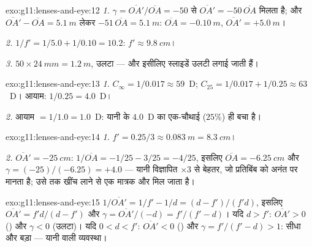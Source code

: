 \begin{solution}{exo:g11:lenses-and-eye:12}
\emph{1.} $\gamma = \overline{OA'}/\overline{OA} = -50$ से $\overline{OA'} = -50\,\overline{OA}$ मिलता है; और $\overline{OA'} - \overline{OA} = \qty{5.1}{m}$ लेकर $-51\,\overline{OA} = \qty{5.1}{m}$: $\overline{OA} = \qty{-0.10}{m}$,
$\overline{OA'} = +\qty{5.0}{m}$।

\emph{2.} $1/f' = 1/5.0 + 1/0.10 = 10.2$: $f' \approx \qty{9.8}{cm}$।

\emph{3.} $50 \times \qty{24}{mm} = \qty{1.2}{m}$, उलटा --- और इसीलिए स्लाइडें उलटी लगाई जाती हैं।
\end{solution}

\begin{solution}{exo:g11:lenses-and-eye:13}
\emph{1.} $C_\infty = 1/0.017 \approx 59$~D; $C_{25} = 1/0.017 + 1/0.25 \approx 63$~D। आयाम: $1/0.25 = 4.0$~D।

\emph{2.} आयाम $= 1/1.0 = 1.0$~D: यानी  के $4.0$~D
का एक-चौथाई ($25\%$) ही बचा है।
\end{solution}

\begin{solution}{exo:g11:lenses-and-eye:14}
\emph{1.} $f' = 0.25/3 \approx \qty{0.083}{m} = \qty{8.3}{cm}$।

\emph{2.} $\overline{OA'} = \qty{-25}{cm}$: $1/\overline{OA} = -1/25 - 3/25 = -4/25$, इसलिए $\overline{OA} = \qty{-6.25}{cm}$ और $\gamma = (-25)/(-6.25) = +4.0$ --- यानी विज्ञापित
$\times 3$ से बेहतर, जो प्रतिबिंब को अनंत पर मानता है; उसे
 तक खींच लाने से एक मात्रक और मिल जाता है।
\end{solution}

\begin{solution}{exo:g11:lenses-and-eye:15}
$1/\overline{OA'} = 1/f' - 1/d = (d - f')/(f'd)$, इसलिए $\overline{OA'} = f'd/(d - f')$ और $\gamma = \overline{OA'}/(-d) = f'/(f' - d)$। यदि $d > f'$: $\overline{OA'} > 0$
() और $\gamma < 0$ (उलटा)। यदि $0 < d < f'$: $\overline{OA'} < 0$
() और $\gamma = f'/(f' - d) > 1$: सीधा और बड़ा --- यानी  वाली
व्यवस्था।
\end{solution}

